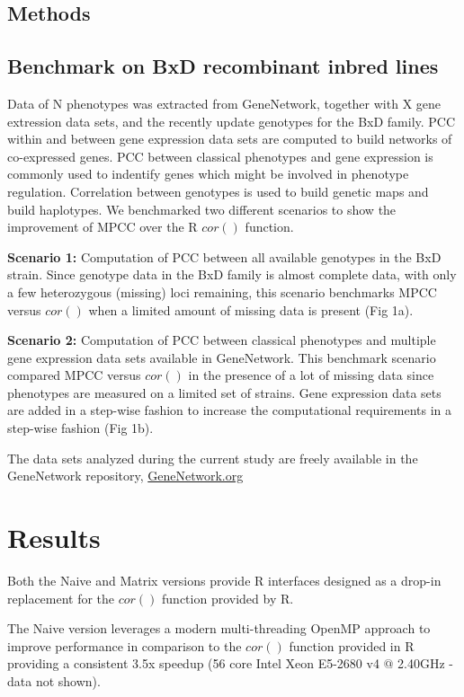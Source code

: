 \documentclass{bioinfo}
\begin{document}
\begin{methods}
\section{Methods}

\subsection{Benchmark on BxD recombinant inbred lines}
Data of N phenotypes was extracted from GeneNetwork, together with 
X gene extression data sets, and the recently update genotypes for 
the BxD family. PCC within and between gene expression data sets are 
computed to build networks of co-expressed genes. PCC between 
classical phenotypes and gene expression is commonly used to 
indentify genes which might be involved in phenotype regulation. 
Correlation between genotypes is used to build genetic maps and 
build haplotypes. We benchmarked two different scenarios to show 
the improvement of MPCC over the R $cor()$ function.

{\bf Scenario 1:} Computation of PCC between all available genotypes 
in the BxD strain. Since genotype data in the BxD family is almost 
complete data, with only a few heterozygous (missing) loci remaining, 
this scenario benchmarks MPCC versus $cor()$ when a limited amount of 
missing data is present (Fig 1a).

{\bf Scenario 2:} Computation of PCC between classical phenotypes and 
multiple gene expression data sets available in GeneNetwork. This 
benchmark scenario compared MPCC versus $cor()$ in the presence of 
a lot of missing data since phenotypes are measured on a limited set 
of strains. Gene expression data sets are added in a step-wise fashion 
to increase the computational requirements in a step-wise fashion 
(Fig 1b).

The data sets analyzed during the current study are freely available in the 
GeneNetwork repository, \href{https://genenetwork.org/}{GeneNetwork.org}

\end{methods}

\section{Results}
Both the Naive and Matrix versions provide R interfaces designed as a drop-in 
replacement for the $cor()$ function provided by R.

The Naive version leverages a modern multi-threading OpenMP approach 
to improve performance in comparison to the $cor()$ function provided 
in R providing a consistent 3.5x speedup (56 core Intel Xeon E5-2680 
v4 $@$ 2.40GHz - data not shown). 
\end{document}
